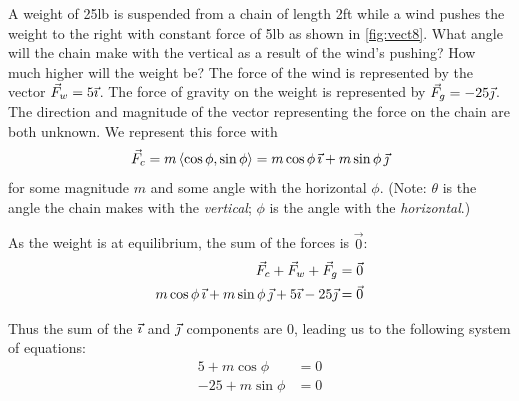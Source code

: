 \begin{example}\label{ex_vect8}%
A
%
%
weight of 25lb is suspended from a chain of length 2ft while a wind pushes the weight to the right with constant force of 5lb as shown in \autoref{fig:vect8}. What angle will the chain make with the vertical as a result of the wind's pushing? How much higher will the weight be?
\solution
The force of the wind is represented by the vector $\vec F_w = 5\vec\imath$. The force of gravity on the weight is represented by $\vec F_g = -25\vec\jmath$. The direction and magnitude of the vector representing the force on the chain are both unknown. We represent this force with
\[\vec F_c = m\left\langle \cos\phi,\sin\phi\right\rangle= m\cos\phi\, \vec\imath + m\sin\phi\,\vec\jmath\]
for some magnitude $m$ and some angle with the horizontal $\phi$. (Note: $\theta$ is the angle the chain makes with the \emph{vertical}; $\phi$ is the angle with the \emph{horizontal}.)

As the weight is at equilibrium, the sum of the forces is $\vec0$:
\begin{align*}
\vec F_c + \vec F_w + \vec F_g &= \vec 0\\
m\cos\phi\, \vec\imath + m\sin\phi\,\vec\jmath + 5\vec\imath - 25\vec\jmath &=\vec 0
\end{align*}

Thus the sum of the $\vec\imath$ and $\vec\jmath$ components are 0, leading us to the following system of equations:
\begin{align}
5+m\cos\phi &= 0\\
-25+m\sin\phi &= 0
\label{eq:vect8}
\end{align}


\end{example}
